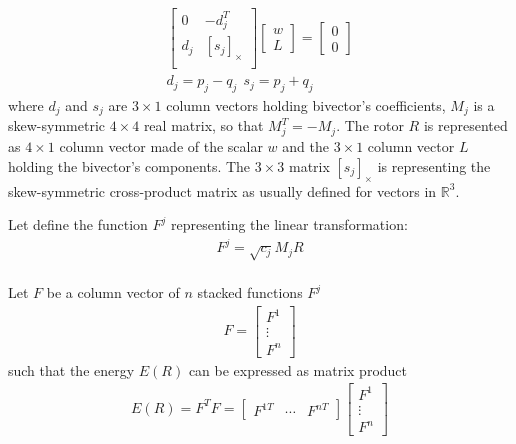 \documentclass{birkjour}
\numberwithin{equation}{section}
\begin{document}
\begin{eqnarray*}
\left[\begin{array}{cc}
0      &           -d_j^T \\
d_j    &   \left[ s_j \right]_\times \\
\end{array}\right]
\left[\begin{array}{c} 
	w \\
	L
\end{array}\right] = 
\left[\begin{array}{c}
	0 \\
	0 
\end{array}\right]\\
d_j = p_j - q_j \ \ s_j = p_j + q_j
\end{eqnarray*}
where $d_j$ and $s_j$ are $3 \times 1$ column vectors holding bivector's coefficients, $M_j$ is a skew-symmetric $4\times 4$ real matrix, so that $M_j^T = -M_j$. The rotor $R$ is represented as $4 \times 1$ column vector made of the scalar $w$ and the $3 \times 1$ column vector $L$ holding the bivector's components. The $3\times 3$ matrix $\left[ s_j \right]_\times$ is representing the skew-symmetric cross-product matrix as usually defined for vectors in $\mathbb R^3$.

Let define the function $F^j$ representing the linear transformation:
\begin{eqnarray*}
F^j = \sqrt{c_j} M_j R\\
\end{eqnarray*}

Let $F$ be a column vector of $n$ stacked functions $F^j$
\begin{eqnarray*}
F = \left[\begin{array}{c}F^1 \\ \vdots \\ F^n\end{array}\right]
\end{eqnarray*}
 such that the energy $E(R)$ can be expressed as matrix product
\begin{eqnarray*}
E(R) = F^T F =
\left[\begin{array}{ccc}F^{1T} & \cdots & F^{nT}\end{array}\right]
\left[\begin{array}{c}F^1 \\ \vdots \\ F^n\end{array}\right]
\end{eqnarray*}
\end{document}

